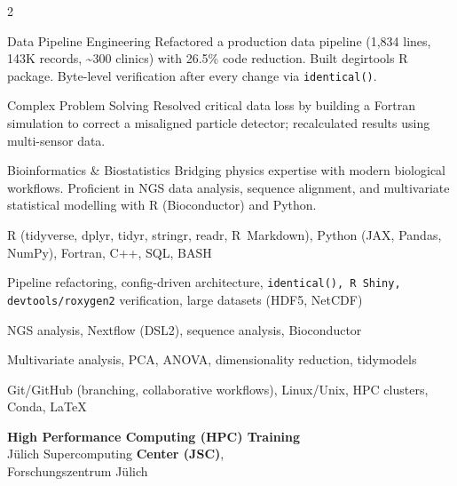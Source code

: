 \documentclass{thejus_cv}
\begin{document}
\begin{paracol}{2}
\switchcolumn



\cvstrength{\faStar}
           {Data Pipeline Engineering}
           {Refactored a production data pipeline (1,834 lines, 143K records, \textasciitilde300 clinics) with 26.5\% code reduction. Built degirtools R package. Byte-level verification after every change via \texttt{identical()}.}

\cvstrength{\faLightbulb}
           {Complex Problem Solving}
           {Resolved critical data loss by building a Fortran simulation to correct a misaligned particle detector; recalculated results using multi-sensor data.}

\cvstrength{\faAward}
           {Bioinformatics \& Biostatistics}
           {Bridging physics expertise with modern biological workflows. Proficient in NGS data analysis, sequence alignment, and multivariate statistical modelling with R (Bioconductor) and Python.}


         {R (tidyverse, dplyr, tidyr, stringr, readr, R~Markdown), Python (JAX, Pandas, NumPy), Fortran, C++, SQL, BASH}

         {Pipeline refactoring, config-driven architecture, \texttt{identical(), R Shiny, devtools/roxygen2} verification, large datasets (HDF5, NetCDF)}

         {NGS analysis, Nextflow (DSL2), sequence analysis, Bioconductor}

         {Multivariate analysis, PCA, ANOVA, dimensionality reduction, tidymodels}

         {Git/GitHub (branching, collaborative workflows), Linux/Unix, HPC clusters, Conda, LaTeX}





\textbf{High Performance Computing (HPC) Training}\\
J\"ulich Supercomputing \textbf{Center (JSC)},\\
Forschungszentrum J\"ulich\\[0.3cm]


\end{paracol}
\end{document}
